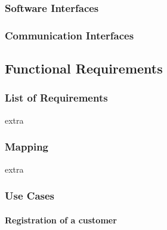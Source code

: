 \documentclass{article}
\begin{document}
		\subsubsection{Software Interfaces}
		\subsubsection{Communication Interfaces}
	\subsection{Functional Requirements}
		\subsubsection{List of Requirements}
		extra
		\subsubsection{Mapping}
		extra
		\subsubsection{Use Cases}
		
			\newpage
			
			\paragraph{Registration of a customer}
			
\end{document}
